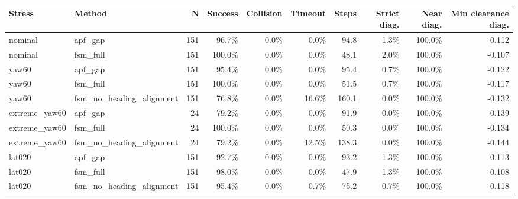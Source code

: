 \begin{tabular}{llrrrrrrrr}
\toprule
Stress & Method & N & Success & Collision & Timeout & Steps & Strict diag. & Near diag. & Min clearance diag. \\
\midrule
nominal & apf\_gap & 151 & 96.7\% & 0.0\% & 0.0\% & 94.8 & 1.3\% & 100.0\% & -0.112 \\
nominal & fsm\_full & 151 & 100.0\% & 0.0\% & 0.0\% & 48.1 & 2.0\% & 100.0\% & -0.107 \\
yaw60 & apf\_gap & 151 & 95.4\% & 0.0\% & 0.0\% & 95.4 & 0.7\% & 100.0\% & -0.122 \\
yaw60 & fsm\_full & 151 & 100.0\% & 0.0\% & 0.0\% & 51.5 & 0.7\% & 100.0\% & -0.117 \\
yaw60 & fsm\_no\_heading\_alignment & 151 & 76.8\% & 0.0\% & 16.6\% & 160.1 & 0.0\% & 100.0\% & -0.132 \\
extreme\_yaw60 & apf\_gap & 24 & 79.2\% & 0.0\% & 0.0\% & 91.9 & 0.0\% & 100.0\% & -0.139 \\
extreme\_yaw60 & fsm\_full & 24 & 100.0\% & 0.0\% & 0.0\% & 50.3 & 0.0\% & 100.0\% & -0.134 \\
extreme\_yaw60 & fsm\_no\_heading\_alignment & 24 & 79.2\% & 0.0\% & 12.5\% & 138.3 & 0.0\% & 100.0\% & -0.144 \\
lat020 & apf\_gap & 151 & 92.7\% & 0.0\% & 0.0\% & 93.2 & 1.3\% & 100.0\% & -0.113 \\
lat020 & fsm\_full & 151 & 98.0\% & 0.0\% & 0.0\% & 47.9 & 1.3\% & 100.0\% & -0.108 \\
lat020 & fsm\_no\_heading\_alignment & 151 & 95.4\% & 0.0\% & 0.7\% & 75.2 & 0.7\% & 100.0\% & -0.118 \\
\bottomrule
\end{tabular}
